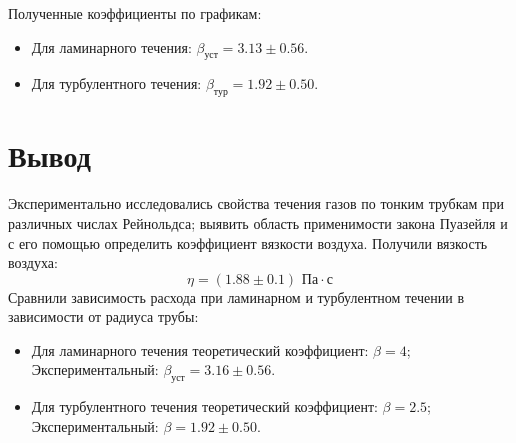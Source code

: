 \documentclass[a4paper, 12pt]{article}
\begin{document}
	Полученные коэффициенты по графикам: 
	\begin{itemize}
		\item Для ламинарного течения: $\beta_\text{уст} = 3.13\pm0.56$.
		\item Для турбулентного течения: $\beta_\text{тур} = 1.92\pm 0.50$.
	\end{itemize}

	\section{Вывод}
	
	Экспериментально исследовались свойства течения газов по тонким трубкам при различных числах Рейнольдса; выявить область применимости закона Пуазейля и с его помощью
	определить коэффициент вязкости воздуха. Получили вязкость воздуха:
	\begin{equation*}
		\eta = (1.88\pm 0.1)\text{ Па}\cdot\text{с}
	\end{equation*}
	Сравнили зависимость расхода при  ламинарном и турбулентном течении в зависимости от радиуса трубы:
	\begin{itemize}
		\item Для ламинарного течения теоретический коэффициент: $\beta = 4$; Экспериментальный: $\beta_{\text{уст}} = 3.16\pm0.56.$
		\item Для турбулентного течения теоретический коэффициент: $\beta = 2.5$; Экспериментальный: $\beta = 1.92\pm0.50.$
	\end{itemize}
	
\end{document}
